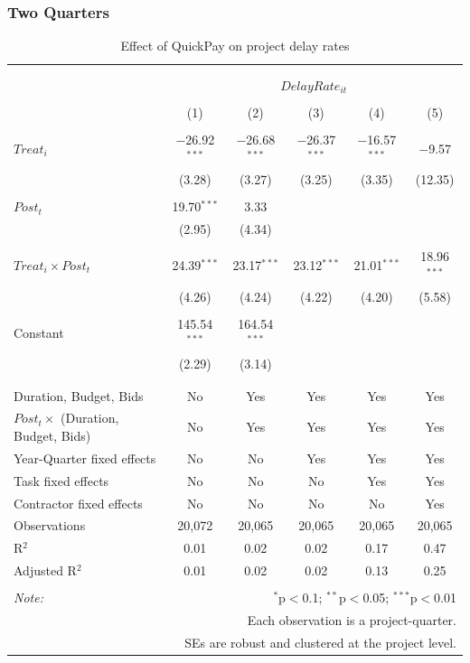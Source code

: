 \documentclass[
]{article}
\begin{document}
\hypertarget{two-quarters-4}{%
\subsubsection{Two Quarters}\label{two-quarters-4}}

\begin{table}[H] \centering 
  \caption{Effect of QuickPay on project delay rates} 
  \label{} 
\small 
\begin{tabular}{@{\extracolsep{-2pt}}lccccc} 
\\[-1.8ex]\hline 
\hline \\[-1.8ex] 
\\[-1.8ex] & \multicolumn{5}{c}{$DelayRate_{it}$} \\ 
\\[-1.8ex] & (1) & (2) & (3) & (4) & (5)\\ 
\hline \\[-1.8ex] 
 $Treat_i$ & $-$26.92$^{***}$ & $-$26.68$^{***}$ & $-$26.37$^{***}$ & $-$16.57$^{***}$ & $-$9.57 \\ 
  & (3.28) & (3.27) & (3.25) & (3.35) & (12.35) \\ 
  & & & & & \\ 
 $Post_t$ & 19.70$^{***}$ & 3.33 &  &  &  \\ 
  & (2.95) & (4.34) &  &  &  \\ 
  & & & & & \\ 
 $Treat_i \times Post_t$ & 24.39$^{***}$ & 23.17$^{***}$ & 23.12$^{***}$ & 21.01$^{***}$ & 18.96$^{***}$ \\ 
  & (4.26) & (4.24) & (4.22) & (4.20) & (5.58) \\ 
  & & & & & \\ 
 Constant & 145.54$^{***}$ & 164.54$^{***}$ &  &  &  \\ 
  & (2.29) & (3.14) &  &  &  \\ 
  & & & & & \\ 
\hline \\[-1.8ex] 
Duration, Budget, Bids & No & Yes & Yes & Yes & Yes \\ 
$Post_t \times$  (Duration, Budget, Bids) & No & Yes & Yes & Yes & Yes \\ 
Year-Quarter fixed effects & No & No & Yes & Yes & Yes \\ 
Task fixed effects & No & No & No & Yes & Yes \\ 
Contractor fixed effects & No & No & No & No & Yes \\ 
Observations & 20,072 & 20,065 & 20,065 & 20,065 & 20,065 \\ 
R$^{2}$ & 0.01 & 0.02 & 0.02 & 0.17 & 0.47 \\ 
Adjusted R$^{2}$ & 0.01 & 0.02 & 0.02 & 0.13 & 0.25 \\ 
\hline 
\hline \\[-1.8ex] 
\textit{Note:}  & \multicolumn{5}{r}{$^{*}$p$<$0.1; $^{**}$p$<$0.05; $^{***}$p$<$0.01} \\ 
 & \multicolumn{5}{r}{Each observation is a project-quarter.} \\ 
 & \multicolumn{5}{r}{SEs are robust and clustered at the project level.} \\ 
\end{tabular} 
\end{table}
\end{document}
